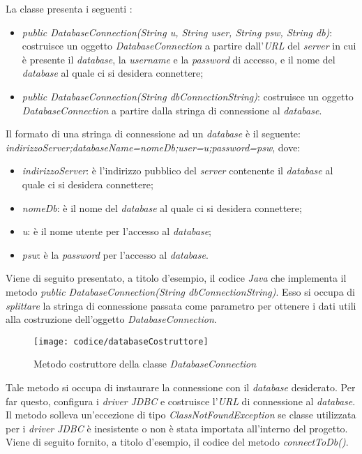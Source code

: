 La classe presenta i seguenti :
\begin{itemize}
	\item \textit{public DatabaseConnection(String u, String user, String psw, String db)}: costruisce un oggetto \textit{DatabaseConnection} a partire dall'\textit{URL} del \textit{server} in cui è presente il \textit{database}, la \textit{username} e la \textit{password} di accesso, e il nome del \textit{database} al quale ci si desidera connettere;
	\item \textit{public DatabaseConnection(String dbConnectionString)}: costruisce un oggetto \textit{DatabaseConnection} a partire dalla stringa di connessione al \textit{database}.
\end{itemize}
Il formato di una stringa di connessione ad un \textit{database} è il seguente: \textit{indirizzoServer;databaseName=nomeDb;user=u;password=psw}, dove:
\begin{itemize}
	\item \textit{indirizzoServer}: è l'indirizzo pubblico del \textit{server} contenente il \textit{database} al quale ci si desidera connettere;
	\item \textit{nomeDb}: è il nome del \textit{database} al quale ci si desidera connettere;
	\item \textit{u}: è il nome utente per l'accesso al \textit{database};
	\item \textit{psw}: è la \textit{password} per l'accesso al \textit{database}.
\end{itemize}
Viene di seguito presentato, a titolo d'esempio, il codice \textit{Java} che implementa il metodo \textit{public DatabaseConnection(String dbConnectionString)}. Esso si occupa di \textit{splittare} la stringa di connessione passata come parametro per ottenere i dati utili alla costruzione dell'oggetto \textit{DatabaseConnection}.
\newpage
\begin{figure}[!h] 
    \centering 
    \texttt{[image: codice/databaseCostruttore]} 
    \caption{Metodo costruttore della classe \textit{DatabaseConnection}}
\end{figure}


Tale metodo si occupa di instaurare la connessione con il \textit{database} desiderato. Per far questo, configura i \textit{driver} \textit{JDBC} e costruisce l'\textit{URL} di connessione al \textit{database}. Il metodo solleva un'eccezione di tipo \textit{ClassNotFoundException} se classe utilizzata per i \textit{driver} \textit{JDBC} è inesistente o non è stata importata all'interno del progetto. Viene di seguito fornito, a titolo d'esempio, il codice del metodo \textit{connectToDb()}.

